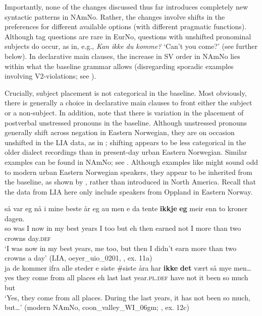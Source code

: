 \documentclass[output=paper]{langscibook}
\begin{document}
Importantly, none of the changes discussed thus far introduces completely new syntactic patterns in NAmNo. Rather, the changes involve shifts in the preferences for different available options (with different pragmatic functions). Although tag questions are rare in EurNo, questions with unshifted pronominal subjects do occur, as in, e.g., \textit{Kan ikke du komme?} ‘Can’t you come?’ (see further  below). In declarative main clauses, the increase in SV order in NAmNo lies within what the baseline grammar allows (disregarding sporadic examples involving V2-violations; see ). 

Crucially, subject placement is not categorical in the baseline. Most obviously, there is generally a choice in declarative main clauses to front either the subject or a non-subject. In addition, \citet{LarssonForthcoming} note that there is variation in the placement of postverbal unstressed pronouns in the baseline. Although unstressed pronouns generally shift across negation in Eastern Norwegian, they are on occasion unshifted in the LIA data, as in ; shifting appears to be less categorical in the older dialect recordings than in present-day urban Eastern Norwegian. Similar examples can be found in NAmNo; see . Although examples like  might sound odd to modern urban Eastern Norwegian speakers, they appear to be inherited from the baseline, as shown by , rather than introduced in North America. Recall that the data from LIA here only include speakers from Oppland in Eastern Norway.

\ea 
\gll så var  eg nå i mine beste   år eg   au men e da   tente \textbf{ikkje}   \textbf{eg} meir enn   to kroner dagen.\\ 
    so was I now in my best years I   too but eh then earned not   I more than   two   crowns day.\textsc{def}\\
\glt ‘I was now in my best years, me too, but then I didn’t earn more than two crowns a day’ (LIA, oeyer\_uio\_0201, \citealt{LarssonForthcoming}, ex. 11a)\label{ex:larsson:12}\\

\ex  
\gll ja de kommer ifra alle steder e siste \#siste   åra      har \textbf{ikke} \textbf{det}  vært så mye   men…\\
yes they come from all places eh last last year.\textsc{pl.def} have not it been so much but\\
\glt ‘Yes, they come from all places. During the last years, it has not been so much, but…’ (modern NAmNo, coon\_valley\_WI\_06gm; \citealt{LarssonForthcoming}, ex. 12c)\label{ex:larsson:13}\\
\z
\end{document}
